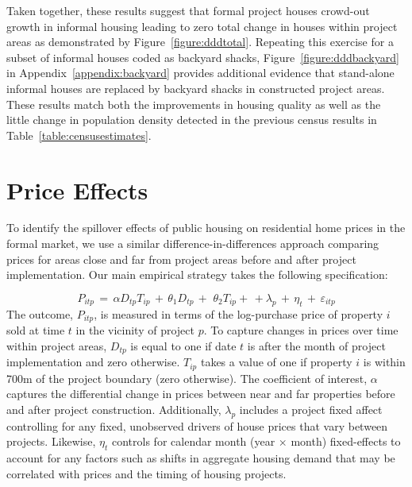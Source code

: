 \documentclass[12pt]{article}
\begin{document}
Taken together, these results suggest that formal project houses crowd-out growth in informal housing leading to zero total change in houses within project areas as demonstrated by Figure~\ref{figure:dddtotal}.  Repeating this exercise for a subset of informal houses coded as backyard shacks, Figure~\ref{figure:dddbackyard} in Appendix~\ref{appendix:backyard} provides additional evidence that stand-alone informal houses are replaced by backyard shacks in constructed project areas.  These results match both the improvements in housing quality as well as the little change in population density detected in the previous census results in Table~\ref{table:censusestimates}.


\section{Price Effects}\label{section:resultsprices}

To identify the spillover effects of public housing on residential home prices in the formal market, we use a similar difference-in-differences approach comparing prices for areas close and far from project areas before and after project implementation.  Our main empirical strategy takes the following specification:

\begin{equation*}
P_{itp} \, = \, \alpha D_{tp}T_{ip} \, + \,\theta_1 D_{tp} \, + \, \,\theta_2 T_{ip}+ \, +  \lambda_p \,  + \, \eta_{t} \, + \, \varepsilon_{itp}
\end{equation*}
The outcome, $P_{itp}$, is measured in terms of the log-purchase price of property $i$ sold at time $t$ in the vicinity of project $p$.  To capture changes in prices over time within project areas, $D_{tp}$ is equal to one if date $t$ is after the month of project implementation and zero otherwise.  $T_{ip}$ takes a value of one if property $i$ is within 700m of the project boundary (zero otherwise).  The coefficient of interest, $\alpha$ captures the differential change in prices between near and far properties before and after project construction.   Additionally, $\lambda_p$ includes a project fixed affect controlling for any fixed, unobserved drivers of house prices that vary between projects.  Likewise, $\eta_{t}$ controls for calendar month (year$\,\times\,$month) fixed-effects to account for any factors such as shifts in aggregate housing demand that may be correlated with prices and the timing of housing projects.
\end{document}
